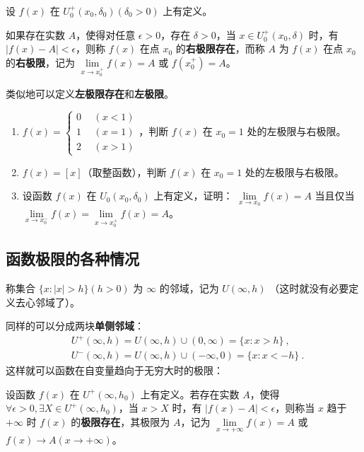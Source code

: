   设 $f(x)$ 在 $U^+_0(x_0,\delta_0)(\delta_0>0)$ 上有定义。

  如果存在实数 $A$，使得对任意 $\epsilon >0$，存在 $\delta>0$，当 $x\in U_0^+(x_0,\delta)$ 时，有 $|f(x)-A|<\epsilon$，则称 $f(x)$ 在点 $x_0$ 的\textbf{右极限存在}，而称 $A$ 为 $f(x)$ 在点 $x_0$ 的\textbf{右极限}，记为 $\lim\limits_{x\rightarrow x_0^+}f(x)=A$ 或 $f(x_0^+)=A$。

  类似地可以定义\textbf{左极限存在}和\textbf{左极限}。

\begin{exercise}{}
\begin{enumerate}
\item $f(x)=\left\{\begin{aligned} 0\ \ &(x<1)\\ 1\ \ &(x= 1)\\2\ \ &(x>1) \end{aligned}\right.$，判断 $f(x)$ 在 $x_0=1$ 处的左极限与右极限。
\item  $f(x)=[x]$（取整函数），判断 $f(x)$ 在 $x_0=1$ 处的左极限与右极限。
\item  设函数 $f(x)$ 在 $U_0(x_0,\delta_0)$ 上有定义，证明： $\lim\limits_{x\rightarrow x_0} f(x)=A$ 当且仅当 $\lim\limits_{x\rightarrow x_0^-}f(x)=\lim\limits_{x\rightarrow x_0^+}f(x)=A$。
\end{enumerate}
\end{exercise}

\subsection{函数极限的各种情况}
称集合 $\{x:|x|>h\}(h>0)$ 为 $\infty$ 的邻域，记为 $U(\infty,h)$ （这时就没有必要定义去心邻域了）。

同样的可以分成两块\textbf{单侧邻域}：
\begin{equation}
\begin{aligned}
&U^+(\infty,h)=U(\infty,h)\cup (0,\infty)=\{x:x>h\}~,\\
&U^-(\infty,h)=U(\infty,h)\cup (-\infty,0)=\{x:x<-h\}~.
\end{aligned}
\end{equation}
  这样就可以函数在自变量趋向于无穷大时的极限：

  设函数 $f(x)$ 在 $U^+(\infty,h_0)$ 上有定义。若存在实数 $A$，使得 $\forall \epsilon >0, \exists X\in U^+(\infty,h_0)$，当 $x>X$ 时，有 $|f(x)-A|<\epsilon$，则称当 $x$ 趋于 $+\infty$ 时 $f(x)$ 的\textbf{极限存在}，其极限为 $A$，记为 $\lim\limits_{x\rightarrow +\infty}f(x)=A$ 或 $f(x)\rightarrow A(x\rightarrow +\infty)$。

